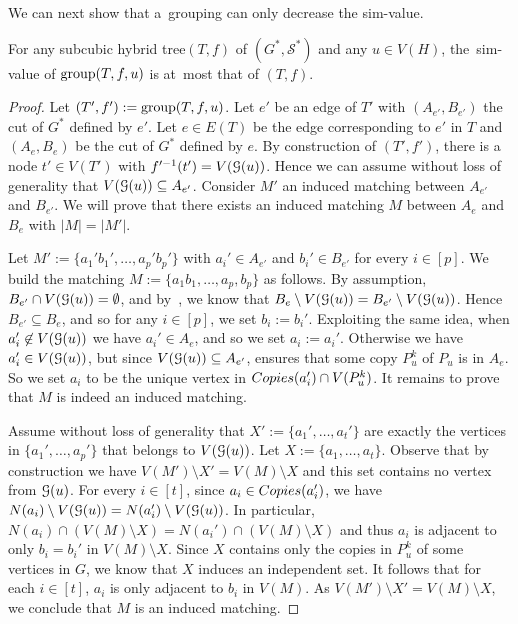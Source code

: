 \documentclass[a4paper,UKenglish,cleveref,hyperref,autoref]{lipics-v2021}
\newcommand{\htree}{hybrid tree\xspace}
\begin{document}
We can next show that a~grouping can only decrease the sim-value. 

\begin{lemma}\label{lem:dec-sim-value}
For any subcubic \htree $(T, f)$ of $(G^*, \mathcal S^*)$ and any $u \in V(H)$, the~sim-value of $\text{group}(T, f, u)$ is at~most that of $(T, f)$.
\end{lemma}
\begin{proof}
Let $(T', f') := \text{group}(T, f, u)$.
Let $e'$ be an edge of $T'$ with $(A_{e'}, B_{e'})$ the cut of $G^*$ defined by $e'$.
Let $e \in E(T)$ be the edge corresponding to $e'$ in $T$ and $(A_e, B_e)$ be the cut of $G^*$ defined by $e$.
By construction of $(T', f')$, there is a node $t' \in V(T')$ with $f'^{-1}(t') = V(\mathcal G(u))$.
Hence we can assume without loss of generality that $V(\mathcal G(u)) \subseteq A_{e'}$.
Consider $M'$ an induced matching between $A_{e'}$ and $B_{e'}$.
We will prove that there exists an induced matching $M$ between $A_e$ and $B_e$ with $|M| = |M'|$.

Let $M' := \{a_1'b_1', \dots, a_p' b_p'\}$ with $a_i' \in A_{e'}$ and $b_i' \in B_{e'}$ for every $i \in [p]$.
We build the matching $M := \{a_1b_1, \dots, a_p, b_p\}$ as follows.
By assumption, $B_{e'} \cap V(\mathcal G(u)) = \emptyset$, and by~, we know that $B_e \setminus V(\mathcal G(u)) = B_{e'} \setminus V(\mathcal G(u))$.
Hence $B_{e'} \subseteq B_e$, and so for any $i \in [p]$, we set $b_i := b_i'$.	
Exploiting the same idea, when $a_i' \not \in V(\mathcal G(u))$ we have $a_i' \in A_e$, and so we set $a_i := a_i'$.
Otherwise we have $a_i' \in V(\mathcal G(u))$, but since $V(\mathcal G(u)) \subseteq A_{e'}$,  ensures that some copy $P_u^k$ of $P_u$ is in $A_e$.
So we set $a_i$ to be the unique vertex in $\copies(a_i') \cap V(P_u^k)$.
It remains to prove that $M$ is indeed an induced matching.

Assume without loss of generality that $X' := \{a_1',\dots,a_t'\}$ are exactly the vertices in $\{a_1',\dots,a_p'\}$ that belongs to $V(\mathcal G(u))$.
Let $X := \{a_1,\dots, a_t \}$.
Observe that by construction we have $V(M')\setminus X' = V(M) \setminus X$ and this set contains no vertex from $\mathcal G(u)$.
For every $i\in [t]$, since $a_i \in \copies(a_i')$, we have $N(a_i) \setminus V(\mathcal G(u)) = N(a_i') \setminus V(\mathcal G(u))$.
In particular, $N(a_i) \cap (V(M)\setminus X) = N(a_i')\cap (V(M)\setminus X)$ and thus $a_i$ is adjacent to only $b_i=b_i'$ in $V(M)\setminus X$.
Since $X$ contains only the copies in $P_u^k$ of some vertices in $G$, we know that $X$ induces an independent set.
It follows that for each $i\in [t]$, $a_i$ is only adjacent to $b_i$ in $V(M)$.
As $V(M')\setminus X' = V(M) \setminus X$, we conclude that $M$ is an induced matching.



\end{proof}
\end{document}
